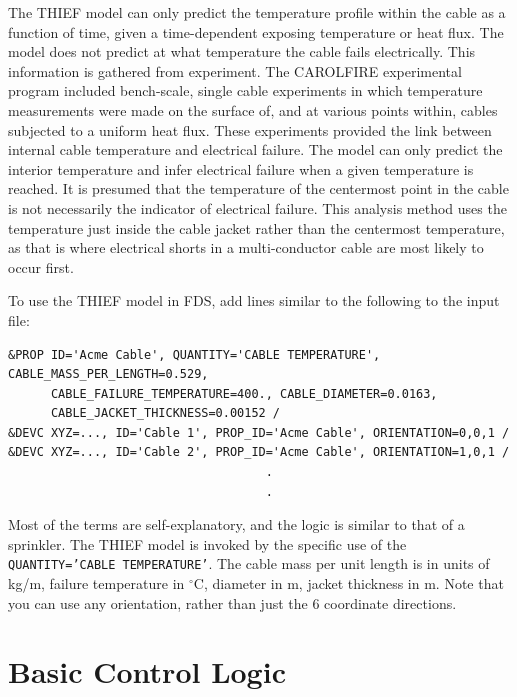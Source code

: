 \documentclass[11pt]{book}
\newcommand{\ct}{\tt\small}
\begin{document}
The THIEF model can only predict the temperature profile within the cable as a function of time,
given a time-dependent exposing temperature or heat flux. The model does not predict at what
temperature the cable fails electrically. This information is gathered from experiment. The
CAROLFIRE experimental program included bench-scale, single cable experiments in which
temperature measurements were made on the surface of, and at various points within, cables
subjected to a uniform heat flux. These experiments provided the link between internal cable
temperature and electrical failure. The model can only predict the interior temperature and infer
electrical failure when a given temperature is reached. It is presumed that the
temperature of the centermost point in the cable is not necessarily the indicator of electrical
failure. This analysis method uses the temperature just inside the cable jacket rather than the
centermost temperature, as that is where electrical shorts in a multi-conductor cable are most
likely to occur first.

To use the THIEF model in FDS, add lines similar to the following to the input file:

\footnotesize
\begin{verbatim}
&PROP ID='Acme Cable', QUANTITY='CABLE TEMPERATURE', CABLE_MASS_PER_LENGTH=0.529,
      CABLE_FAILURE_TEMPERATURE=400., CABLE_DIAMETER=0.0163,
      CABLE_JACKET_THICKNESS=0.00152 /
&DEVC XYZ=..., ID='Cable 1', PROP_ID='Acme Cable', ORIENTATION=0,0,1 /
&DEVC XYZ=..., ID='Cable 2', PROP_ID='Acme Cable', ORIENTATION=1,0,1 /
                                    .
                                    .
\end{verbatim}
\normalsize

\noindent
Most of the terms are self-explanatory, and the logic is similar to that of a sprinkler. The THIEF
model is invoked by the specific use of the {\ct QUANTITY='CABLE TEMPERATURE'}. The cable mass per
unit length is in units of kg/m, failure temperature in $^\circ$C, diameter in m, jacket thickness in m. Note that
you can use any orientation, rather than just the 6 coordinate directions.




\clearpage

\section{Basic Control Logic}
\label{info:basic_control}
\end{document}
